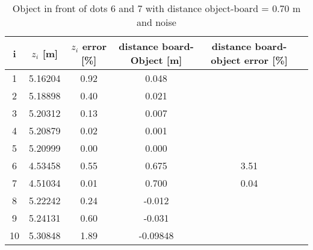 \begin{table}[H]
\centering
\caption{Object in front of dots 6 and 7 with distance object-board = 0.70 m and noise}
\label{res70cm}
\renewcommand{\arraystretch}{1.5}
\begin{tabular}{|c|c|c|c|c|c|}
\hline
i & $z_i$ [m] & $z_i$ error [\%] & distance board-Object [m] & distance board-object error [\%] \\
\hline
1 & 5.16204 & 0.92 & 0.048 & \\
\hline
2 & 5.18898 & 0.40 & 0.021 & \\
\hline
3 & 5.20312 & 0.13 & 0.007 & \\
\hline
4 & 5.20879 & 0.02 & 0.001 & \\
\hline
5 & 5.20999 & 0.00 & 0.000 & \\
\hline
6 & 4.53458 & 0.55 & 0.675 & 3.51 \\
\hline
7 & 4.51034 & 0.01 & 0.700 & 0.04 \\
\hline
8 & 5.22242 & 0.24 & -0.012 & \\
\hline
9 & 5.24131 & 0.60 & -0.031 & \\
\hline
10 & 5.30848 & 1.89 & -0.09848 & \\
\hline
\end{tabular}
\end{table}